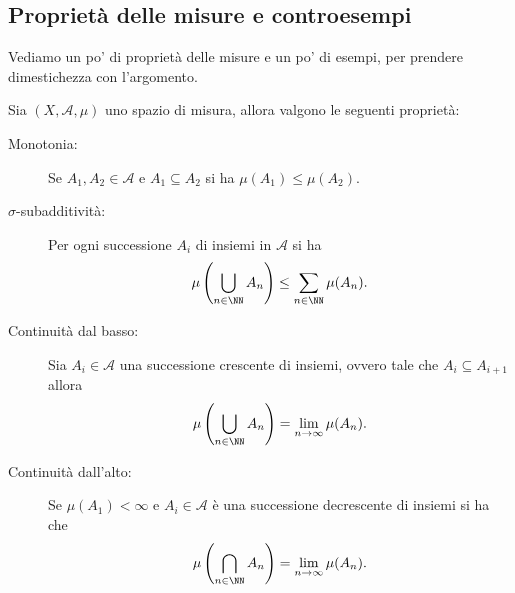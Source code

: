 \documentclass[11pt]{scrartcl}
\begin{document}
	\subsection{Proprietà delle misure e controesempi}
	Vediamo un po' di proprietà delle misure e un po' di esempi, per prendere dimestichezza con l'argomento.
	\begin{proposition}
		Sia $(X,\mathcal{A},\mu)$ uno spazio di misura, allora valgono le seguenti proprietà:
		\begin{description}
			\item[Monotonia:] Se $A_1,A_2\in \mathcal{A}$ e $A_1\subseteq A_2$ si ha $\mu(A_1)\le \mu(A_2)$.
			\item[$\sigma$-subadditività:] Per ogni successione $A_i$ di insiemi in $\mathcal{A}$ si ha
			$$\mu\left(\bigcup_{n\in\NN}A_n\right)\le \sum_{n\in\NN}\mu(A_n).$$
			\item[Continuità dal basso:] Sia $A_i\in\mathcal{A}$ una successione crescente di insiemi, ovvero tale che $A_i\subseteq A_{i+1}$ allora
			$$\mu\left(\bigcup_{n\in\NN}A_n\right)=\lim_{n\to\infty}\mu(A_n).$$
			\item[Continuità dall'alto:] Se $\mu(A_1)<\infty$ e $A_i\in\mathcal{A}$ è una successione decrescente di insiemi si ha che 
			$$\mu\left(\bigcap_{n\in\NN}A_n\right)=\lim_{n\to\infty}\mu(A_n).$$
		\end{description}
	\end{proposition}
\end{document}
